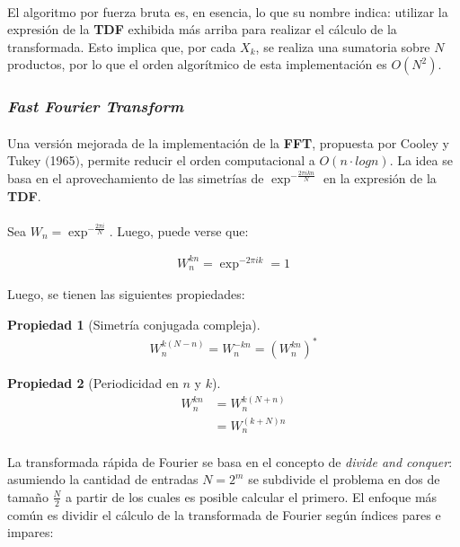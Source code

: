 \documentclass[12pt, twocolumn]{article}
\newtheorem{theorem}{Propiedad}
\begin{document}
	\paragraph{} El algoritmo por fuerza bruta es, en esencia, lo que su nombre indica: utilizar la expresión de la \textbf{TDF} exhibida más arriba para realizar el cálculo de la transformada. Esto implica que, por cada $X_{k}$, se realiza una sumatoria sobre $N$ productos, por lo que el orden algorítmico de esta implementación es $O(N^{2})$.
	
	\subsubsection{\textit{Fast Fourier Transform}}
	
	\paragraph{} Una versión mejorada de la implementación de la \textbf{FFT}, propuesta por Cooley y Tukey $($1965$)$, permite reducir el orden computacional a $O(n\cdot log n)$. La idea se basa en el aprovechamiento de las simetrías de $\exp^{-\frac{2\pi i k n}{N}}$ en la expresión de la \textbf{TDF}.
	
	\paragraph{} Sea $W_{n} = \exp^{-\frac{2\pi i}{N}}$. Luego, puede verse que:
	
	\begin{align}
		W_{n}^{kn} = \exp^{-2\pi i k} = 1
	\end{align}
	
	Luego, se tienen las siguientes propiedades:
	
	\begin{theorem}[Simetría conjugada compleja]
		\begin{align*}
			W_{n}^{k(N-n)} = W_{n}^{-kn} = (W_{n}^{kn})^{*}
		\end{align*}
	\end{theorem}
	
	\begin{theorem}[Periodicidad en $n$ y $k$]
		\begin{align*}
			W_{n}^{kn} &= W_{n}^{k(N+n)} \\
			&= W_{n}^{(k+N)n}
		\end{align*}
	\end{theorem}
	
	\paragraph{} La transformada rápida de Fourier se basa en el concepto de \textit{divide and conquer}: asumiendo la cantidad de entradas $N = 2^{m}$ se subdivide el problema en dos de tamaño $\frac{N}{2}$ a partir de los cuales es posible calcular el primero. El enfoque más común es dividir el cálculo de la transformada de Fourier según índices pares e impares:
	
\end{document}
